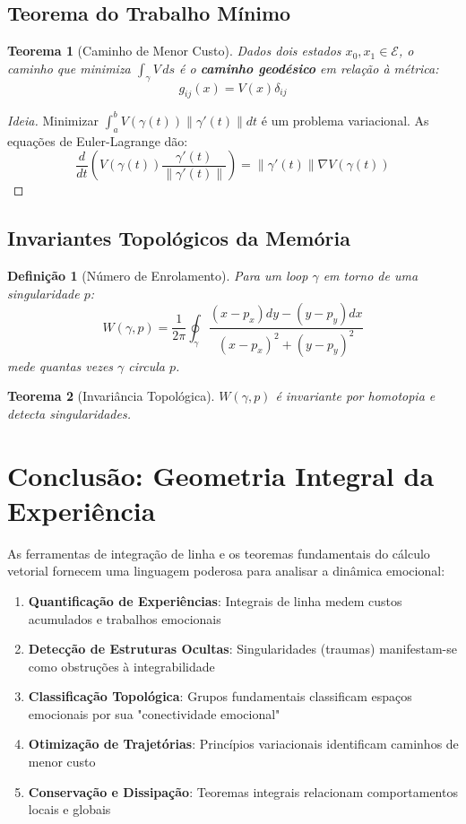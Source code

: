 \documentclass[12pt, a4paper]{article}
\newtheorem{definition}{Definição}
\newtheorem{theorem}{Teorema}
\begin{document}
\subsection{Teorema do Trabalho Mínimo}

\begin{theorem}[Caminho de Menor Custo]
Dados dois estados $x_0, x_1 \in \mathcal{E}$, o caminho que minimiza $\int_\gamma V \, ds$ é o \textbf{caminho geodésico} em relação à métrica:
\[
g_{ij}(x) = V(x) \delta_{ij}
\]
\end{theorem}

\begin{proof}[Ideia]
Minimizar $\int_a^b V(\gamma(t))\|\gamma'(t)\| dt$ é um problema variacional. As equações de Euler-Lagrange dão:
\[
\frac{d}{dt}\left( V(\gamma(t)) \frac{\gamma'(t)}{\|\gamma'(t)\|} \right) = \|\gamma'(t)\| \nabla V(\gamma(t))
\]
\end{proof}

\subsection{Invariantes Topológicos da Memória}

\begin{definition}[Número de Enrolamento]
Para um loop $\gamma$ em torno de uma singularidade $p$:
\[
W(\gamma, p) = \frac{1}{2\pi} \oint_\gamma \frac{(x-p_x)dy - (y-p_y)dx}{(x-p_x)^2 + (y-p_y)^2}
\]
mede quantas vezes $\gamma$ circula $p$.
\end{definition}

\begin{theorem}[Invariância Topológica]
$W(\gamma, p)$ é invariante por homotopia e detecta singularidades.
\end{theorem}

\section{Conclusão: Geometria Integral da Experiência}

As ferramentas de integração de linha e os teoremas fundamentais do cálculo vetorial fornecem uma linguagem poderosa para analisar a dinâmica emocional:

\begin{enumerate}
\item \textbf{Quantificação de Experiências}: Integrais de linha medem custos acumulados e trabalhos emocionais

\item \textbf{Detecção de Estruturas Ocultas}: Singularidades (traumas) manifestam-se como obstruções à integrabilidade

\item \textbf{Classificação Topológica}: Grupos fundamentais classificam espaços emocionais por sua "conectividade emocional"

\item \textbf{Otimização de Trajetórias}: Princípios variacionais identificam caminhos de menor custo

\item \textbf{Conservação e Dissipação}: Teoremas integrais relacionam comportamentos locais e globais
\end{enumerate}
\end{document}
